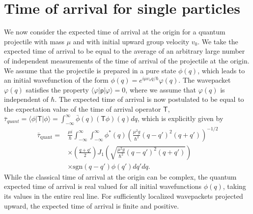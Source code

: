 \documentclass[%
 reprint,
 amsmath,amssymb,
 aps,
]{revtex4-1}
\newcommand{\opr}[1]{\ensuremath{\mathbf{\mathsf{#1}}}}
\begin{document}
\section{Time of arrival for single particles}
\label{sec:toa_expec}

We now consider the expected time of arrival at the origin for a quantum projectile with mass $\mu$ and with initial upward group velocity $v_0$. We take the expected time of arrival to be equal to the average of an arbitrary large number of independent measurements of the time of arrival of the projectile at the origin. We assume that the projectile is prepared in a pure state $\phi(q)$, which leads to an initial wavefunction of the form $\phi(q)=e^{i\mu v_o q/\hbar}\varphi(q)$. The wavepacket $\varphi(q)$ satisfies the property $\langle\varphi|\opr{p}|\varphi\rangle=0$, where we assume that $\varphi(q)$ is independent of $\hbar$. The expected time of arrival is now postulated to be equal to the expectation value of the time of arrival operator $\opr{T}$,  $\bar{\tau}_{quant}=\langle\phi|\opr{T}|\phi\rangle=\int_{-\infty}^{\infty}\bar{\phi}(q)(\opr{T}\phi)(q)dq$, which is explicitly given by
\begin{align}
	\bar{\tau}_{\text{quant}}=& \frac{\mu i}{\hbar} \int_{-\infty}^{\infty} \int_{-\infty}^{\infty} \phi^*(q)   \left(\frac{\mu^2 g}{\hbar^2} (q-q')^2 (q+q')\right)^{-1/2} \nonumber \\
	&\times \left(\frac{q+q'}{2}\right) J_1\left(\sqrt{\frac{\mu^2 g}{\hbar^2} (q-q')^2 (q+q')}\right) \nonumber \\
	& \times  \text{sgn}(q-q') \phi(q') dq'dq.
	\label{toaexpec}
\end{align}
While the classical time of arrival at the origin can be complex, the quantum expected time of arrival is real valued for all initial wavefunctions $\phi(q)$, taking its values in the entire real line. For sufficiently localized wavepackets projected upward, the expected time of arrival is finite and positive. 
\end{document}
